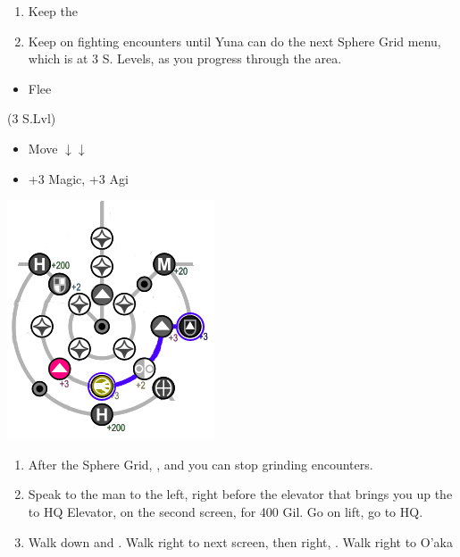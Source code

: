 \begin{enumerate}[resume]
	\item Keep the \formation{\kimahri}{\wakka}{\yuna}
	\item Keep on fighting encounters until Yuna can do the next Sphere Grid menu, which is at 3 S. Levels, as you progress through the area.
\end{enumerate}
\begin{encounters}
	\begin{itemize}
		\wakkaf Attack Raptors or Gandarewas
		\yunaf Defend
		\item Flee
	\end{itemize}
\end{encounters}
\bothvfill\winvfill\lossvfill
\begin{spheregrid}
	\begin{itemize}
		\yunaf (3 S.Lvl)
		\begin{itemize}
			\item Move $\downarrow\downarrow$
			\item +3 Magic, +3 Agi
		\end{itemize}
		\includegraphics{graphics/Yuna_MRR_2}
	\end{itemize}
\end{spheregrid}
\begin{enumerate}[resume]
	\item After the Sphere Grid, \formation{\tidus}{\yuna}{\wakka}, and you can stop grinding encounters.
	\item Speak to the man to the left, right before the elevator that brings you up the to HQ Elevator, on the second screen, for 400 Gil. Go on lift, go to HQ.
	\item Walk down and \sd. Walk right to next screen, then right, \sd. Walk right to O'aka
\end{enumerate}
